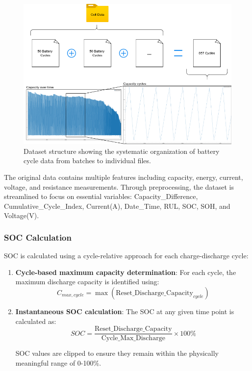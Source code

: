 \begin{figure}[htbp]
\centering
\includegraphics[width=1.0\textwidth]{imgs/cycles_files.png}
\caption{Dataset structure showing the systematic organization of battery cycle data from batches to individual files.}
\label{fig:dataset_structure}
\end{figure}

The original data contains multiple features including capacity, energy, current, voltage, and resistance measurements. Through preprocessing, the dataset is streamlined to focus on essential variables: Capacity\_Difference, Cumulative\_Cycle\_Index, Current(A), Date\_Time, RUL, SOC, SOH, and Voltage(V).

\subsubsection{SOC Calculation}
\label{subsubsec:soc_calculation}

SOC is calculated using a cycle-relative approach for each charge-discharge cycle:

\begin{enumerate}
    \item \textbf{Cycle-based maximum capacity determination}: For each cycle, the maximum discharge capacity is identified using:
    \begin{equation}
        C_{max,cycle} = \max(\text{Reset\_Discharge\_Capacity}_{cycle})
    \end{equation}
    
    \item \textbf{Instantaneous SOC calculation}: The SOC at any given time point is calculated as:
    \begin{equation}
        SOC = \frac{\text{Reset\_Discharge\_Capacity}}{\text{Cycle\_Max\_Discharge}} \times 100\%
    \end{equation}
    
    SOC values are clipped to ensure they remain within the physically meaningful range of 0-100\%.
\end{enumerate}

